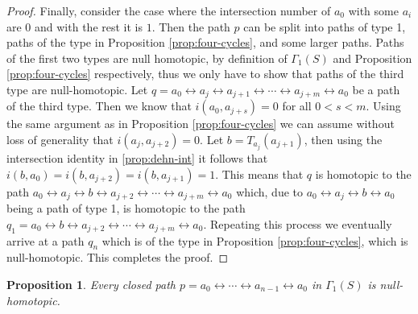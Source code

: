 \documentclass[11pt]{article}
\def\lr{\leftrightarrow}
\newtheorem{proposition}[theorem]{Proposition}
\begin{document}
\begin{proof}
Finally, consider the case where the intersection number of $a_0$ with some $a_i$ are 0 and with the rest it is $1$. Then the path $p$ can be split into paths of type 1, paths of the type in Proposition \ref{prop:four-cycles}, and some larger paths. Paths of the first two types are null homotopic, by definition of $\Gamma_1(S)$ and Proposition \ref{prop:four-cycles} respectively, thus we only have to show that paths of the third type are null-homotopic. Let $q = a_0\lr a_j \lr a_{j+1}\lr \cdots \lr a_{j+m}\lr a_0$ be a path of the third type. Then we know that $i(a_0, a_{j+s})=0$ for all $0< s< m$. Using the same argument as in Proposition \ref{prop:four-cycles} we can assume without loss of generality that $i(a_j, a_{j+2})=0$. Let $b=T_{a_j}(a_{j+1})$, then using the intersection identity in \ref{prop:dehn-int} it follows that $i(b,a_0) = i(b,a_{j+2}) = i(b,a_{j+1}) = 1$. This means that $q$ is homotopic to the path $a_0\lr a_j \lr b \lr a_{j+2} \lr \cdots \lr a_{j+m}\lr a_0$ which, due to $a_0\lr a_j\lr b\lr a_0$ being a path of type 1, is homotopic to the path $q_1=a_0\lr b\lr a_{j+2}\lr \cdots \lr a_{j+m} \lr a_0$. Repeating this process we eventually arrive at a path $q_n$ which is of the type in Proposition \ref{prop:four-cycles}, which is null-homotopic. This completes the proof.
\end{proof}
\begin{proposition}\label{prop:base-case}
  Every closed path $p=a_0\lr\cdots\lr a_{n-1}\lr a_0$ in $\Gamma_1(S)$ is null-homotopic.
\end{proposition}
\end{document}
